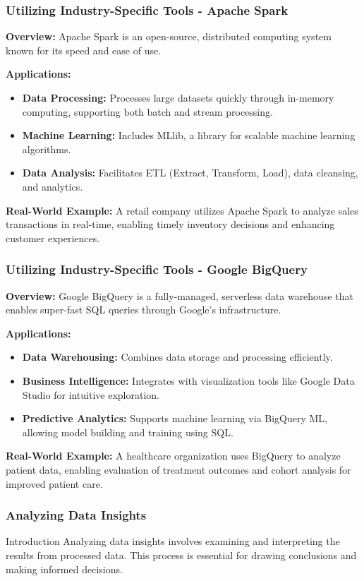 \documentclass[aspectratio=169]{beamer}
\begin{document}
\begin{frame}[fragile]
    \frametitle{Utilizing Industry-Specific Tools - Apache Spark}
    \textbf{Overview:} Apache Spark is an open-source, distributed computing system known for its speed and ease of use.
    
    \textbf{Applications:}
    \begin{itemize}
        \item \textbf{Data Processing:} Processes large datasets quickly through in-memory computing, supporting both batch and stream processing.
        \item \textbf{Machine Learning:} Includes MLlib, a library for scalable machine learning algorithms.
        \item \textbf{Data Analysis:} Facilitates ETL (Extract, Transform, Load), data cleansing, and analytics.
    \end{itemize}

    \textbf{Real-World Example:} A retail company utilizes Apache Spark to analyze sales transactions in real-time, enabling timely inventory decisions and enhancing customer experiences.
\end{frame}

\begin{frame}[fragile]
    \frametitle{Utilizing Industry-Specific Tools - Google BigQuery}
    \textbf{Overview:} Google BigQuery is a fully-managed, serverless data warehouse that enables super-fast SQL queries through Google's infrastructure.
    
    \textbf{Applications:}
    \begin{itemize}
        \item \textbf{Data Warehousing:} Combines data storage and processing efficiently.
        \item \textbf{Business Intelligence:} Integrates with visualization tools like Google Data Studio for intuitive exploration.
        \item \textbf{Predictive Analytics:} Supports machine learning via BigQuery ML, allowing model building and training using SQL.
    \end{itemize}

    \textbf{Real-World Example:} A healthcare organization uses BigQuery to analyze patient data, enabling evaluation of treatment outcomes and cohort analysis for improved patient care.
\end{frame}

\begin{frame}[fragile]
    \frametitle{Analyzing Data Insights}
    \begin{block}{Introduction}
        Analyzing data insights involves examining and interpreting the results from processed data. This process is essential for drawing conclusions and making informed decisions.
    \end{block}
\end{frame}
\end{document}
